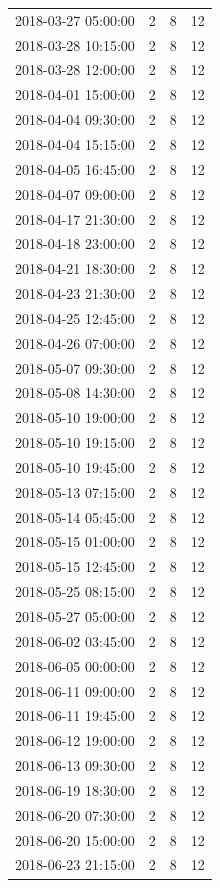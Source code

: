 \begin{tabular}{lrrr}
2018-03-27 05:00:00 & 2 & 8 & 12 \\
2018-03-28 10:15:00 & 2 & 8 & 12 \\
2018-03-28 12:00:00 & 2 & 8 & 12 \\
2018-04-01 15:00:00 & 2 & 8 & 12 \\
2018-04-04 09:30:00 & 2 & 8 & 12 \\
2018-04-04 15:15:00 & 2 & 8 & 12 \\
2018-04-05 16:45:00 & 2 & 8 & 12 \\
2018-04-07 09:00:00 & 2 & 8 & 12 \\
2018-04-17 21:30:00 & 2 & 8 & 12 \\
2018-04-18 23:00:00 & 2 & 8 & 12 \\
2018-04-21 18:30:00 & 2 & 8 & 12 \\
2018-04-23 21:30:00 & 2 & 8 & 12 \\
2018-04-25 12:45:00 & 2 & 8 & 12 \\
2018-04-26 07:00:00 & 2 & 8 & 12 \\
2018-05-07 09:30:00 & 2 & 8 & 12 \\
2018-05-08 14:30:00 & 2 & 8 & 12 \\
2018-05-10 19:00:00 & 2 & 8 & 12 \\
2018-05-10 19:15:00 & 2 & 8 & 12 \\
2018-05-10 19:45:00 & 2 & 8 & 12 \\
2018-05-13 07:15:00 & 2 & 8 & 12 \\
2018-05-14 05:45:00 & 2 & 8 & 12 \\
2018-05-15 01:00:00 & 2 & 8 & 12 \\
2018-05-15 12:45:00 & 2 & 8 & 12 \\
2018-05-25 08:15:00 & 2 & 8 & 12 \\
2018-05-27 05:00:00 & 2 & 8 & 12 \\
2018-06-02 03:45:00 & 2 & 8 & 12 \\
2018-06-05 00:00:00 & 2 & 8 & 12 \\
2018-06-11 09:00:00 & 2 & 8 & 12 \\
2018-06-11 19:45:00 & 2 & 8 & 12 \\
2018-06-12 19:00:00 & 2 & 8 & 12 \\
2018-06-13 09:30:00 & 2 & 8 & 12 \\
2018-06-19 18:30:00 & 2 & 8 & 12 \\
2018-06-20 07:30:00 & 2 & 8 & 12 \\
2018-06-20 15:00:00 & 2 & 8 & 12 \\
2018-06-23 21:15:00 & 2 & 8 & 12 \\

\end{tabular}
